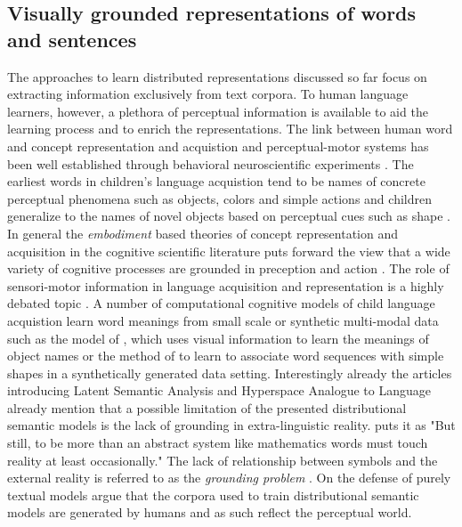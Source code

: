 \subsection{Visually grounded representations of words and sentences}
The approaches to learn distributed representations discussed so far focus on extracting information exclusively
from text corpora. To human language learners, however, a plethora of perceptual information is available to aid the
learning process and to enrich the representations. The link between human word and concept representation and acquistion
and perceptual-motor systems has been well established through behavioral neuroscientific experiments \cite{pulvermuller2005brain}.
The earliest words in children's language acquistion tend to be names of concrete perceptual phenomena
such as objects, colors and simple actions \cite{bornstein2004cross} and children generalize to the names
of novel objects based on perceptual cues such as shape \cite{landau1998object}.
In general the \emph{embodiment} based theories of concept representation and acquisition in the
cognitive scientific literature puts forward the view that a wide variety of cognitive processes
are grounded in preception and action \cite{meteyard2008role}. The role of sensori-motor information in
language acquisition and representation is a highly debated topic \cite{meteyard2012coming}.
A number of
computational cognitive models of child language acquistion learn word meanings from small scale or synthetic
multi-modal data such as the model of \cite{yu2005emergence}, which uses visual information to learn the meanings of object
names or the method of \cite{roy2002learning} to learn to associate word sequences with simple shapes in a synthetically
generated data setting.
Interestingly already the articles introducing Latent Semantic Analysis
\cite{landauer1997solution} and Hyperspace Analogue to Language \cite{lund1996producing} already mention that a possible
limitation of the presented distributional semantic models is the lack of grounding in extra-linguistic reality.
\cite{landauer1997solution} puts it as "But still, to be more than an abstract system like mathematics words must
touch reality at least occasionally." The lack of relationship between symbols and the external reality is referred
to as the \emph{grounding problem} \cite{harnad1990symbol,perfetti1998limits}.
On the defense of purely textual models \cite{louwerse2011symbol} argue that the corpora
used to train distributional semantic models are generated by humans and as such reflect the perceptual world.
